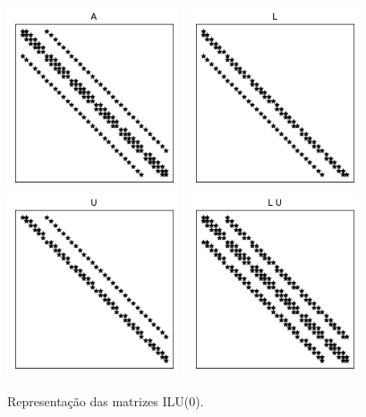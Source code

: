\begin{figure}[H]
  \centering
  \includegraphics[width=0.45\textwidth]{cap_sislin/dados/figPoissonDnhIlu0/A}~
  \includegraphics[width=0.45\textwidth]{cap_sislin/dados/figPoissonDnhIlu0/L}\\
  \includegraphics[width=0.45\textwidth]{cap_sislin/dados/figPoissonDnhIlu0/U}~
  \includegraphics[width=0.45\textwidth]{cap_sislin/dados/figPoissonDnhIlu0/LU}
  \caption{Representação das matrizes ILU(0).}
  \label{fig:poissonDnhIlu0}
\end{figure}

